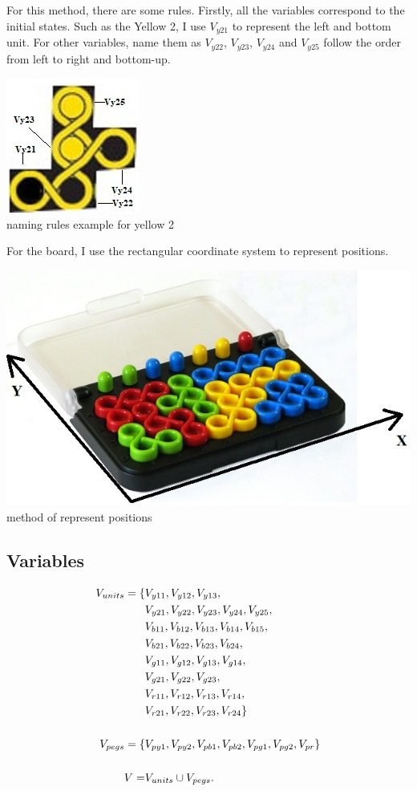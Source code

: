 For this method, there are some rules. Firstly, all the variables correspond to the initial states. Such as the Yellow 2, I use $V_{y21}$ to represent the left and bottom unit. For other variables, name them as $V_{y22}$, $V_{y23}$, $V_{y24}$ and $V_{y25}$ follow the order from left to right and bottom-up.
\begin{center}
\includegraphics{example.jpg}
\\naming rules example for yellow 2
\end{center}
For the board, I use the rectangular coordinate system to represent positions. 
\begin{center}
\includegraphics{IQtwistboard.jpg}
\\method of represent positions
\end{center}
\subsection{Variables}
\begin{align*}
V_{units}=\{&V_{y11},V_{y12},V_{y13},\\&V_{y21},V_{y22},V_{y23},V_{y24},V_{y25},\\&V_{b11},V_{b12},V_{b13},V_{b14},
V_{b15},\\&V_{b21},V_{b22},V_{b23},V_{b24},\\&V_{g11},V_{g12},V_{g13},V_{g14},\\&V_{g21},V_{g22},V_{g23},\\&V_{r11},
V_{r12},V_{r13},V_{r14},\\&V_{r21},V_{r22},V_{r23},V_{r24}\}\\
\\V_{pegs} = \{&V_{py1}, V_{py2}, V_{pb1}, V_{pb2}, V_{pg1}, V_{pg2}, V_{pr}\}\\
\\V = &V_{units} \cup V_{pegs}.
\end{align*}
